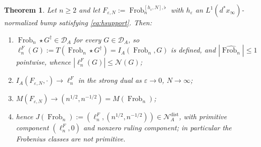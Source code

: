 \documentclass[11pt]{amsart}
\newtheorem{theorem}{Theorem}[section]
\theoremstyle{definition}
\theoremstyle{remark}
\newcommand{\Frob}{\operatorname{Frob}}
\newcommand{\DA}{\mathcal D_A}
\begin{document}
\begin{theorem}\label{thm:frobincompletion}
Let $n\ge2$ and let $F_{\varepsilon,N}:=\Frob_n^{[h_\varepsilon,N],\flat}$ with
$h_\varepsilon$ an $L^1(d^*x_\infty)$-normalized bump satisfying
\eqref{eq:hsupport}. Then:
\begin{enumerate}
\item[(i)] $\Frob_n\star G^\dagger\in\DA$ for every $G\in\DA$, so
$\ell_n^F(G):=T(\Frob_n\star G^\dagger)=I_A(\Frob_n,G)$ is defined, and
$|\widehat{\Frob_n}|\le1$ pointwise, whence
$|\ell_n^F(G)|\le\mathcal N(G)$;
\item[(ii)] $I_A(F_{\varepsilon,N},\cdot)\to\ell_n^F$ in the strong dual as
$\varepsilon\to0$, $N\to\infty$;
\item[(iii)] $M(F_{\varepsilon,N})\to(n^{1/2},n^{-1/2})=M(\Frob_n)$;
\item[(iv)] hence $J(\Frob_n):=(\ell_n^F,(n^{1/2},n^{-1/2}))
\in\mathcal N_A^{\mathrm{dist}}$, with primitive component $(\ell_n^F,0)$ and
nonzero ruling component; in particular the Frobenius classes are not
primitive.
\end{enumerate}
\end{theorem}
\end{document}
